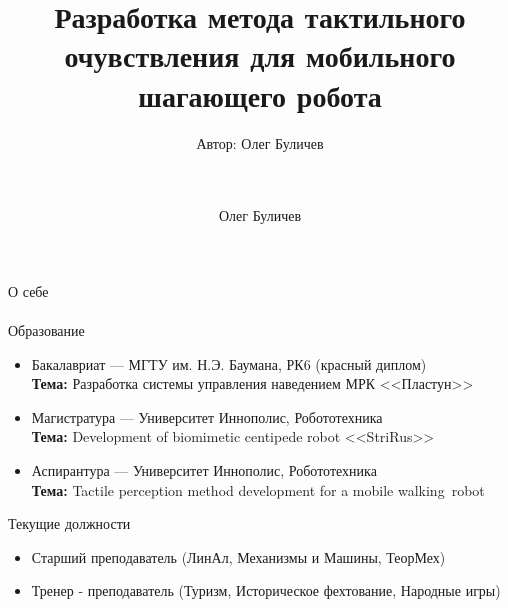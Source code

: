 \documentclass[aspectratio=169,xcolor=table]{beamer}
\title[]{Разработка метода тактильного очувствления для мобильного шагающего робота} %
\subtitle{Автор: Олег Буличев \\ \  \\ \ } %
\author{Олег Буличев}
\newcommand{\fbckg}[1]{\usebackgroundtemplate{\texttt{[image: \#1]}}}%
\begin{document}
\setlength{\abovedisplayskip}{0pt}
\setlength{\belowdisplayskip}{0pt}
\setlength{\abovedisplayshortskip}{0pt}
\setlength{\belowdisplayshortskip}{0pt}

\fbckg{fibeamer/figs/title_page.png}

\fbckg{fibeamer/figs/common.png}

\begin{frame}[t]{О себе}
    \framesubtitle{}
    \vspace{-0.2cm}
    \begin{exampleblock}{Образование}
        \vspace{-0.2cm}
        \begin{itemize}
            \item Бакалавриат --- МГТУ им. Н.Э. Баумана, РК6 (красный диплом) \\ \textbf{Тема:} Разработка системы управления наведением МРК <<Пластун>>
            \item Магистратура --- Университет Иннополис, Робототехника \\ \textbf{Тема:} Development of biomimetic centipede robot <<StriRus>>
            \item Аспирантура --- Университет Иннополис, Робототехника \\ \textbf{Тема:} Tactile perception method development for a mobile walking~robot
        \end{itemize}
    \end{exampleblock}
    \begin{alertblock}{Текущие должности}
        \vspace{-0.2cm}
        \begin{itemize}
            \item Старший преподаватель (ЛинАл, Механизмы и Машины, ТеорМех)
            \item Тренер - преподаватель (Туризм, Историческое фехтование, Народные игры)
        \end{itemize}
    \end{alertblock}
\end{frame}
\end{document}
